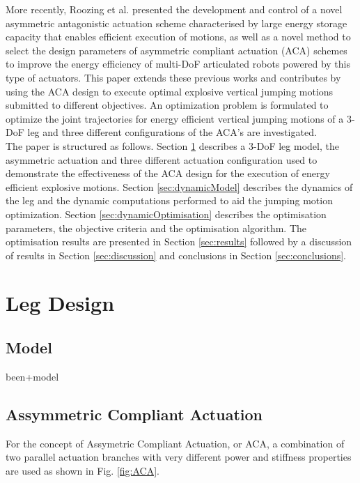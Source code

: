 \documentclass[letterpaper, 10 pt, conference]{ieeeconf}  %
\begin{document}
More recently, Roozing et al. \cite{roozing2016design,roozing2016development} presented the development and control of a novel asymmetric antagonistic actuation scheme characterised by large energy storage capacity that enables efficient execution of motions, as well as a novel method to select the design parameters of asymmetric
compliant actuation (ACA) schemes to improve the energy efficiency of multi-DoF articulated robots powered by this type of actuators. This paper extends these previous works and contributes by using the ACA design to execute optimal explosive vertical jumping motions submitted to different objectives. An optimization problem is formulated to optimize the joint trajectories for energy efficient vertical jumping motions of a 3-DoF leg and three different configurations of the ACA's are investigated.\\
The paper is structured as follows. Section \ref{sec:legDesign} describes a 3-DoF leg model, the asymmetric actuation and three different actuation configuration used to demonstrate the effectiveness of the ACA design for the execution of energy efficient explosive motions. Section \ref{sec:dynamicModel} describes the dynamics of the leg and the dynamic computations performed to aid the jumping motion optimization. Section \ref{sec:dynamicOptimisation} describes the optimisation parameters, the objective criteria and the optimisation algorithm. The optimisation results are presented in Section \ref{sec:results} followed by a discussion of results in Section \ref{sec:discussion} and conclusions in Section \ref{sec:conclusions}.


\section{Leg Design } \label{sec:legDesign}

\subsection{Model}

been+model

\subsection{Assymmetric Compliant Actuation}

For the concept of Assymetric Compliant Actuation, or ACA, a combination of two parallel actuation branches with very different power and stiffness properties are used as shown in Fig. \ref{fig:ACA}.
\end{document}
